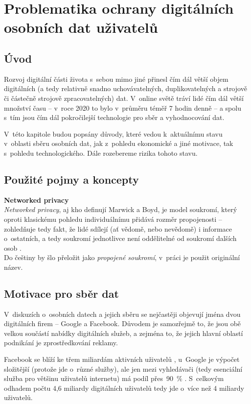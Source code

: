 \chapter{Problematika ochrany digitálních\\ osobních dat uživatelů}

\section*{Úvod}
Rozvoj digitální části života s~sebou mimo jiné přinesl čím dál větší objem digitálních (a tedy relativně snadno uchovávatelných, duplikovatelných a strojově či částečně strojově zpracovatelných) dat. V~online světě tráví lidé čím dál větší množství času -- v~roce 2020 to bylo v~průměru téměř 7 hodin denně \citep{digital-2021-report} -- a spolu s~tím jsou čím dál pokročilejší technologie pro sběr a vyhodnocování dat.

V~této kapitole budou popsány důvody, které vedou k~aktuálnímu stavu v~oblasti sběru osobních dat, jak z~pohledu ekonomické a jiné motivace, tak s~pohledu technologického. Dále rozebereme rizika tohoto stavu.

\section*{Použité pojmy a koncepty}

\textbf{Networked privacy}\\
\textit{Networked privacy}, aj kho definují Marwick a Boyd, je model soukromí, který oproti klasickému pohledu individuálnímu přidává rozměr propojenosti -- zohledňuje tedy fakt, že lidé sdílejí (ať vědomě, nebo nevědomě) i informace o~ostatních, a tedy soukromí jednotlivce není oddělitelné od soukromí dalších osob \citep{networked-privacy}.\\
Do češtiny by šlo přeložit jako \textit{propojené soukromí}, v~práci je použit originální název.

\section{Motivace pro sběr dat}

V~diskuzích o~osobních datech a jejich sběru se nejčastěji objevují jména dvou digitálních firem -- Google a Facebook. Důvodem je samozřejmě to, že jsou obě velkou součástí nabídky digitálních služeb, a zejména to, že jejich hlavní oblastí podnikání je zprostředkování reklamy.

Facebook se blíží ke třem miliardám aktivních uživatelů \citep{facebook-active-users}, u~Google je výpočet složitější (protože jde o~různé služby), ale jen mezi vyhledávači (tedy esenciální služba pro většinu uživatelů internetu) má podíl přes~90~\% \citep{google-search}. S~celkovým odhadem počtu 4,6 miliardy digitálních uživatelů \citep{digital-2021-report} tedy jde o~více než 4 miliardy uživatelů.

